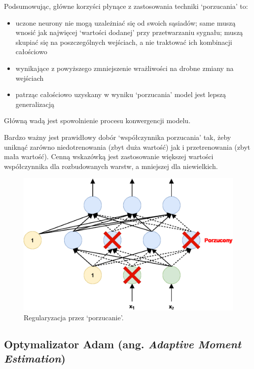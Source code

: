 \documentclass[a4paper,11pt]{article}
\begin{document}
    \bigskip

    Podsumowując, główne korzyści płynące z zastosowania techniki `porzucania' to\cite{UczenieMaszynowe2018}:
    \begin{itemize}
        \item uczone neurony nie mogą uzależniać się od swoich sąsiadów; same muszą wnosić jak najwięcej `wartości dodanej' przy przetwarzaniu sygnału; muszą skupiać się na poszczególnych wejściach, a nie traktować ich kombinacji całościowo
        \item wynikające z powyższego zmniejszenie wrażliwości na drobne zmiany na wejściach
        \item patrząc całościowo uzyskany w wyniku `porzucania' model jest lepszą generalizacją
    \end{itemize}
    \smallskip
    Główną wadą jest spowolnienie procesu konwergencji modelu\cite{UczenieMaszynowe2018}.

    \bigskip

    Bardzo ważny jest prawidłowy dobór `współczynnika porzucania' tak, żeby uniknąć zarówno niedotrenowania (zbyt duża wartość) jak i przetrenowania (zbyt mała wartość). Cenną wskazówką jest zastosowanie większej wartości współczynnika dla rozbudowanych warstw, a mniejszej dla niewielkich.

    \bigskip

    \begin{figure}[H]
        \label{fig:dropout}
        \centering
        \includegraphics[width=\textwidth]{dropout}
        \caption{Regularyzacja przez `porzucanie'\cite{UczenieMaszynowe2018}.}
    \end{figure}

    \subsection{Optymalizator Adam (ang. \textit{Adaptive Moment Estimation})}
\end{document}
